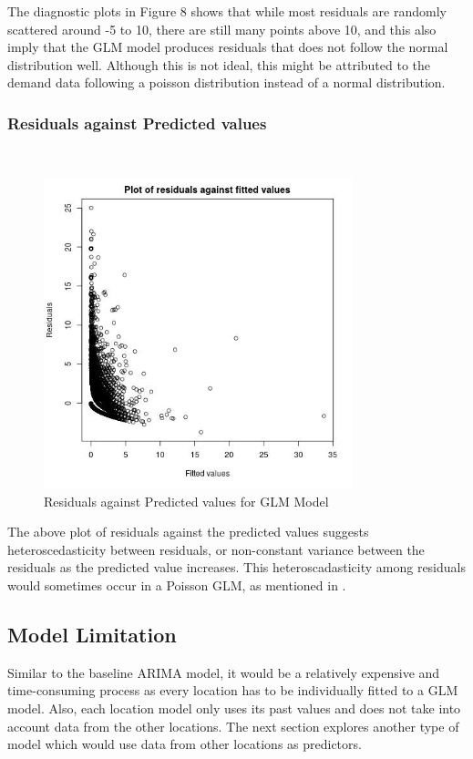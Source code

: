 \documentclass[nonblindrev,msom]{informs3} %
\begin{document}
\noindent The diagnostic plots in Figure 8 shows that while most residuals are randomly scattered around -5 to 10, there are still many points above 10, and this also imply that the GLM model produces residuals that does not follow the normal distribution well. Although this is not ideal, this might be attributed to the demand data following a poisson distribution instead of a normal distribution. 

\subsubsection{Residuals against Predicted values}
\hfill\\
\begin{figure}[H]
    \centering
    \includegraphics[width=0.8\textwidth, height=0.5\textheight]{Images/Full_GLM_resids_vs_fitted.jpg}
    \caption{Residuals against Predicted values for GLM Model}
    \label{fig:Residuals against Predicted values for GLM Model}
\end{figure}
The above plot of residuals against the predicted values suggests heteroscedasticity between residuals, or non-constant variance between the residuals as the predicted value increases. This heteroscadasticity among residuals would sometimes occur in a Poisson GLM, as mentioned in \cite{Dylan2017}. 

\subsection{Model Limitation}
Similar to the baseline ARIMA model, it would be a relatively expensive and time-consuming process as every location has to be individually fitted to a GLM model. Also, each location model only uses its past values and does not take into account data from the other locations. The next section explores another type of model which would use data from other locations as predictors. 
\end{document}
